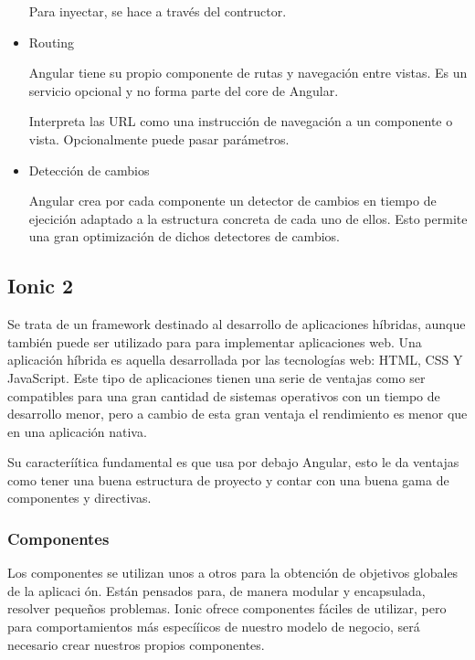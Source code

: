 \documentclass[a4paper, 12pt]{book}
\begin{document}
\begin{itemize}
Para inyectar, se hace a trav\'es del contructor.

\item Routing

Angular tiene su propio componente de rutas y navegaci\'on entre vistas. Es un servicio opcional y no forma parte del core de Angular. 

Interpreta las URL como una instrucci\'on de navegaci\'on a un componente o vista. Opcionalmente puede pasar par\'ametros.

\item Detecci\'on de cambios

Angular crea por cada componente un detector de cambios en tiempo de ejecici\'on adaptado a la estructura concreta de cada uno de ellos. Esto permite una gran optimizaci\'on de dichos detectores de cambios.




\end{itemize}


\subsection{Ionic 2}
\label{subsec:estilo}

Se trata de un framework destinado al desarrollo de aplicaciones h\'ibridas, aunque tambi\'en
puede ser utilizado para para implementar aplicaciones web. Una aplicaci\'on h\'ibrida es aquella
desarrollada por las tecnolog\'ias web: HTML, CSS Y JavaScript. Este tipo de aplicaciones tienen
una serie de ventajas como ser compatibles para una gran cantidad de sistemas operativos con
un tiempo de desarrollo menor, pero a cambio de esta gran ventaja el rendimiento es menor que
en una aplicaci\'on nativa.

Su caracter\'i\'itica fundamental es que usa por debajo Angular, esto le da ventajas como tener
una buena estructura de proyecto y contar con una buena gama de componentes y directivas.

\subsubsection{Componentes}
\label{subsec:estilo}

Los componentes se utilizan unos a otros para la obtenci\'on de objetivos globales de la aplicaci
\'on. Est\'an pensados para, de manera modular y encapsulada, resolver peque\~nos problemas.
Ionic ofrece componentes f\'aciles de utilizar, pero para comportamientos m\'as espec\'i\'iicos de
nuestro modelo de negocio, ser\'a necesario crear nuestros propios componentes.
\end{document}
